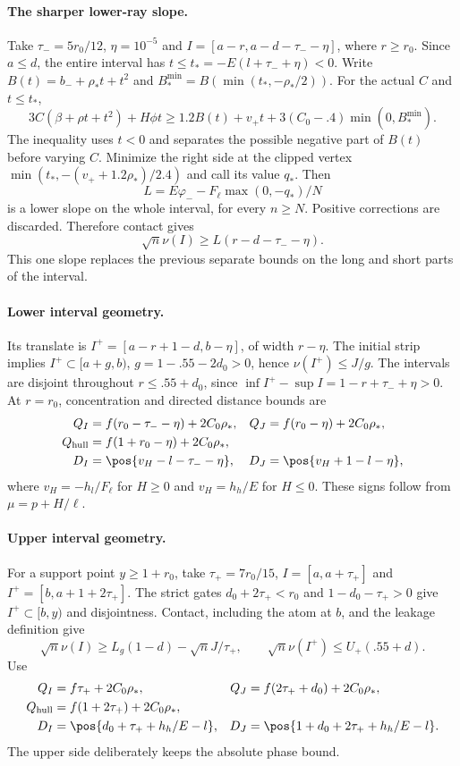 \paragraph{The sharper lower-ray slope.}
Take $\tau_-=5r_0/12$, $\eta=10^{-5}$ and
$I=[a-r,a-d-\tau_--\eta]$, where $r\ge r_0$.
Since $a\le d$, the entire interval has
$t\le t_*=-E(l+\tau_-+\eta)<0$.
Write $B(t)=b_-+\rho_*t+t^2$ and
$B_*^{\min}=B(\min(t_*,-\rho_*/2))$. For the actual $C$ and $t\le t_*$,
\[
 3C(\beta+\rho t+t^2)+H\phi t
 \ge1.2B(t)+v_+t+3(C_0-.4)\min(0,B_*^{\min}).
\]
The inequality uses $t<0$ and separates the possible negative part of
$B(t)$ before varying $C$. Minimize the right side at the clipped vertex
$\min(t_*,-(v_++1.2\rho_*)/2.4)$ and call its value $q_*$. Then
\[
 L=E\varphi_--F_\ell\max(0,-q_*)/N
\]
is a lower slope on the whole interval, for every $n\ge N$.
Positive corrections are discarded. Therefore contact gives
\[
 \sqrt n\nu(I)\ge L(r-d-\tau_--\eta).
\]
This one slope replaces the previous separate bounds on the long and
short parts of the interval.

\paragraph{Lower interval geometry.}
Its translate is $I^+=[a-r+1-d,b-\eta]$, of width $r-\eta$.
The initial strip implies $I^+\subset[a+g,b)$,
$g=1-.55-2d_0>0$, hence $\nu(I^+)\le J/g$.
The intervals are disjoint throughout $r\le.55+d_0$, since
$\inf I^+-\sup I=1-r+\tau_-+\eta>0$.
At $r=r_0$, concentration and directed distance bounds are
\begin{align*}
 Q_I&=f(r_0-\tau_--\eta)+2C_0\rho_*,&
 Q_J&=f(r_0-\eta)+2C_0\rho_*,\\
 Q_{\rm hull}&=f(1+r_0-\eta)+2C_0\rho_*,\\
 D_I&=\pos{v_H-l-\tau_--\eta},&
 D_J&=\pos{v_H+1-l-\eta},
\end{align*}
where $v_H=-h_l/F_\ell$ for $H\ge0$ and $v_H=h_h/E$ for $H\le0$.
These signs follow from $\mu=p+H/\ell$.

\paragraph{Upper interval geometry.}
For a support point $y\ge1+r_0$, take $\tau_+=7r_0/15$,
$I=[a,a+\tau_+]$ and $I^+=[b,a+1+2\tau_+]$.
The strict gates $d_0+2\tau_+<r_0$ and $1-d_0-\tau_+>0$ give
$I^+\subset[b,y)$ and disjointness. Contact, including the atom at $b$,
and the leakage definition give
\[
 \sqrt n\nu(I)\ge L_g(1-d)-\sqrt nJ/\tau_+,\qquad
 \sqrt n\nu(I^+)\le U_+(.55+d).
\]
Use
\begin{align*}
 Q_I&=f\tau_++2C_0\rho_*,&Q_J&=f(2\tau_++d_0)+2C_0\rho_*,\\
 Q_{\rm hull}&=f(1+2\tau_+)+2C_0\rho_*,\\
 D_I&=\pos{d_0+\tau_++h_h/E-l},&
 D_J&=\pos{1+d_0+2\tau_++h_h/E-l}.
\end{align*}
The upper side deliberately keeps the absolute phase bound.


